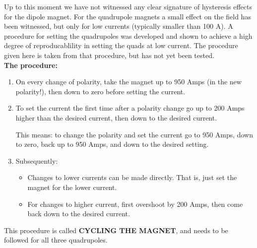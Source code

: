 Up to this moment we have not witnessed any clear signature of hysteresis
effects for the dipole magnet. For the quadrupole magnets a small effect
on the field has been witnessed, but only for low currents (typically smaller
than 100 A). A procedure for setting the quadrupoles was developed
and shown to achieve a high
degree of reproducablility in setting the quads at low current.  The procedure
given here is taken from that procedure, but has not yet  been tested.\\
\textbf{The procedure:} 
\begin{enumerate}
  \item{On every change of polarity, take the magnet up to 950 Amps 
     (in the new polarity!), then down to zero before setting the
     current.} 
  \item{To set the current the first time after a polarity change 
     go up to 200 Amps higher than the desired current, 
     then down to the desired current.

     This means: to change the polarity and set the current go to 950 Amps,
     down to zero, back up to 950 Amps, and down to the desired setting.}
  \item{Subsequently:
  \begin{itemize}
     \item{Changes to lower currents can be made directly. 
        That is, just set the magnet for the lower current.}
     \item{For changes to higher current, first overshoot 
        by 200 Amps, then come back down to the desired current.}
  \end{itemize}}
\end{enumerate} 
This procedure is called \textbf{CYCLING
THE MAGNET}, and needs to be  followed for all three quadrupoles.

